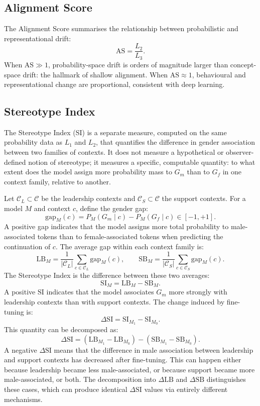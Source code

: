 \documentclass[11pt,a4paper]{article}
\begin{document}
\subsection{Alignment Score}

The Alignment Score summarises the relationship between probabilistic and representational drift:
\[
  \mathrm{AS} = \frac{L_2}{L_3}.
\]
When $\mathrm{AS} \gg 1$, probability-space drift is orders of magnitude larger than
concept-space drift: the hallmark of shallow alignment. When $\mathrm{AS} \approx 1$,
behavioural and representational change are proportional, consistent with deep learning.

\subsection{Stereotype Index}
\label{sec:si}

The Stereotype Index (SI) is a separate measure, computed on the same probability data as
$L_1$ and $L_2$, that quantifies the difference in gender association between two families
of contexts. It does not measure a hypothetical or observer-defined notion of stereotype;
it measures a specific, computable quantity: to what extent does the model assign more
probability mass to $G_m$ than to $G_f$ in one context family, relative to another.

Let $\mathcal{C}_L \subset \mathcal{C}$ be the leadership contexts and
$\mathcal{C}_S \subset \mathcal{C}$ the support contexts. For a model $M$ and context $c$,
define the gender gap:
\[
  \mathrm{gap}_M(c) = P_M(G_m \mid c) - P_M(G_f \mid c) \in [-1, +1].
\]
A positive gap indicates that the model assigns more total probability to male-associated
tokens than to female-associated tokens when predicting the continuation of $c$. The
average gap within each context family is:
\[
  \mathrm{LB}_M = \frac{1}{|\mathcal{C}_L|} \sum_{c \in \mathcal{C}_L} \mathrm{gap}_M(c),
  \qquad
  \mathrm{SB}_M = \frac{1}{|\mathcal{C}_S|} \sum_{c \in \mathcal{C}_S} \mathrm{gap}_M(c).
\]
The Stereotype Index is the difference between these two averages:
\[
  \mathrm{SI}_M = \mathrm{LB}_M - \mathrm{SB}_M.
\]
A positive $\mathrm{SI}$ indicates that the model associates $G_m$ more strongly with
leadership contexts than with support contexts. The change induced by fine-tuning is:
\[
  \Delta\mathrm{SI} = \mathrm{SI}_{M_1} - \mathrm{SI}_{M_0}.
\]
This quantity can be decomposed as:
\[
  \Delta\mathrm{SI}
  = (\mathrm{LB}_{M_1} - \mathrm{LB}_{M_0})
  - (\mathrm{SB}_{M_1} - \mathrm{SB}_{M_0}).
\]
A negative $\Delta\mathrm{SI}$ means that the difference in male association between
leadership and support contexts has decreased after fine-tuning. This can happen either
because leadership became less male-associated, or because support became more
male-associated, or both. The decomposition into $\Delta\mathrm{LB}$ and $\Delta\mathrm{SB}$
distinguishes these cases, which can produce identical $\Delta\mathrm{SI}$ values via
entirely different mechanisms.
\end{document}

